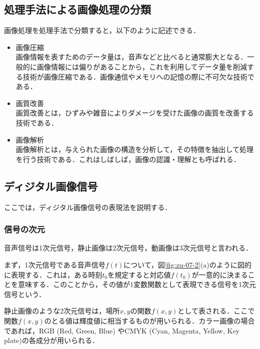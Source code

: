 \subsection{処理手法による画像処理の分類}

画像処理を処理手法で分類すると，以下のように記述できる．

\begin{itemize}
\item {}画像圧縮\\
画像情報を表すためのデータ量は，音声などと比べると通常膨大となる．一般的に画像情報には偏りがあることから，これを利用してデータ量を削減する技術が画像圧縮である．画像通信やメモリへの記憶の際に不可欠な技術である．
\item {}画質改善\\
画質改善とは，ひずみや雑音によりダメージを受けた画像の画質を改善する技術である．
\item {}画像解析\\
画像解析とは，与えられた画像の構造を分析して，その特徴を抽出して処理を行う技術である．これはしばしば，画像の認識・理解とも呼ばれる．
\end{itemize}

\subsection{ディジタル画像信号}

ここでは，ディジタル画像信号の表現法を説明する．

\subsubsection{信号の次元}

音声信号は1次元信号，静止画像は2次元信号，動画像は3次元信号と言われる．

まず，1次元信号である音声信号$f(t)$について，図\ref{fig:zu-07-2}(a)のように図的に表現する．これは，ある時刻$t_0$を規定すると対応値$f(t_0)$が一意的に決まることを意味する．このことから，その値が1変数関数として表現できる信号を1次元信号という．

静止画像のような2次元信号は，場所$x,y$の関数$f(x,y)$として表される．ここで関数$f(x,y)$のとる値は輝度値に相当するものが用いられる．カラー画像の場合であれば，RGB (Red, Green, Blue) やCMYK (Cyan, Magenta, Yellow, Key plate)の各成分が用いられる．


